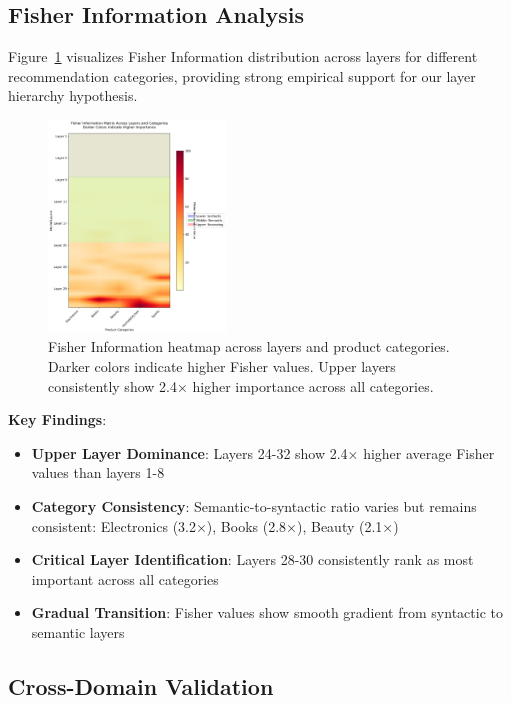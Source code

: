 \documentclass[10pt,conference]{IEEEtran}
\begin{document}
\subsection{Fisher Information Analysis}

Figure~\ref{fig:fisher_analysis} visualizes Fisher Information distribution across layers for different recommendation categories, providing strong empirical support for our layer hierarchy hypothesis.

\begin{figure}[t]
\centering
\includegraphics[width=0.42\textwidth]{figures/fisher_heatmap_enhanced.png}
\caption{Fisher Information heatmap across layers and product categories. Darker colors indicate higher Fisher values. Upper layers consistently show 2.4× higher importance across all categories.}
\label{fig:fisher_analysis}
\end{figure}

\textbf{Key Findings}:
\begin{itemize}[leftmargin=*]
    \item \textbf{Upper Layer Dominance}: Layers 24-32 show 2.4× higher average Fisher values than layers 1-8
    \item \textbf{Category Consistency}: Semantic-to-syntactic ratio varies but remains consistent: Electronics (3.2×), Books (2.8×), Beauty (2.1×)
    \item \textbf{Critical Layer Identification}: Layers 28-30 consistently rank as most important across all categories
    \item \textbf{Gradual Transition}: Fisher values show smooth gradient from syntactic to semantic layers
\end{itemize}

\subsection{Cross-Domain Validation}
\end{document}
